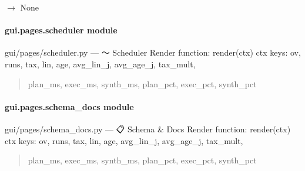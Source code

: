 \documentclass[letterpaper,10pt,english]{sphinxmanual}
\begin{document}
\begin{fulllineitems}
\label{\detokenize{gui.pages.run_drilldown:gui.pages.run_drilldown.render}}
\pysigstartsignatures
\pysiglinewithargsret
{}
{}
{{ $\rightarrow$ None}}
\pysigstopsignatures
\end{fulllineitems}


\sphinxstepscope


\paragraph{gui.pages.scheduler module}
\label{\detokenize{gui.pages.scheduler:module-gui.pages.scheduler}}\label{\detokenize{gui.pages.scheduler:gui-pages-scheduler-module}}\label{\detokenize{gui.pages.scheduler::doc}}
\sphinxAtStartPar
gui/pages/scheduler.py  —  〜  Scheduler
Render function: render(ctx)
ctx keys: ov, runs, tax, lin, age, avg\_lin\_j, avg\_age\_j, tax\_mult,
\begin{quote}

\sphinxAtStartPar
plan\_ms, exec\_ms, synth\_ms, plan\_pct, exec\_pct, synth\_pct
\end{quote}

\begin{fulllineitems}
\label{\detokenize{gui.pages.scheduler:gui.pages.scheduler.render}}
\pysigstartsignatures
\pysiglinewithargsret
{}
{}
{}
\pysigstopsignatures
\end{fulllineitems}


\sphinxstepscope


\paragraph{gui.pages.schema\_docs module}
\label{\detokenize{gui.pages.schema_docs:module-gui.pages.schema_docs}}\label{\detokenize{gui.pages.schema_docs:gui-pages-schema-docs-module}}\label{\detokenize{gui.pages.schema_docs::doc}}
\sphinxAtStartPar
gui/pages/schema\_docs.py  —  📋  Schema \& Docs
Render function: render(ctx)
ctx keys: ov, runs, tax, lin, age, avg\_lin\_j, avg\_age\_j, tax\_mult,
\begin{quote}

\sphinxAtStartPar
plan\_ms, exec\_ms, synth\_ms, plan\_pct, exec\_pct, synth\_pct
\end{quote}
\end{document}
